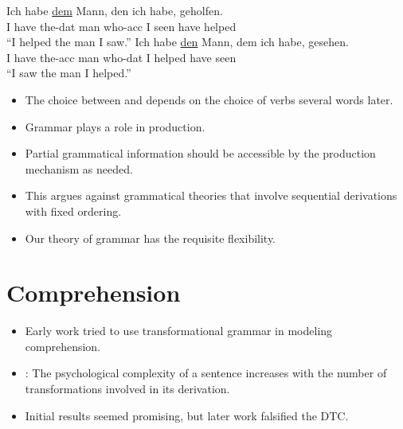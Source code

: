 \documentclass[a4paper,landscape,headrule,footrule]{foils}
\begin{document}
\begin{exe}
\ex\gll Ich habe   \ul{dem}  Mann,  den    ich  habe, geholfen. \\
I   have  the-dat man who-acc I   seen      have   helped\\
\trans    ``I helped the man I saw.''
\ex \gll Ich habe   \ul{den}   Mann,  dem    ich  habe, gesehen.\\
    I   have the-acc man  who-dat I    helped    have   seen\\
\trans    ``I saw the man I helped.''
\end{exe}
\begin{itemize}
\item The choice between  and  depends on the choice of 
  verbs several words later.
\end{itemize}



\begin{itemize}
\item Grammar plays a role in production.
\item Partial grammatical information should be accessible by 
the production mechanism as needed.
\item This argues against grammatical theories that involve 
sequential derivations with fixed ordering.
\item Our theory of grammar has the requisite flexibility.
\end{itemize}

\section{Comprehension}



\begin{itemize}
\item Early work tried to use transformational grammar in 
modeling comprehension.
\item {}:  The 
psychological complexity of a sentence increases 
with the number of transformations involved in its 
derivation.
\item Initial results seemed promising, but later work 
falsified the DTC.
\end{itemize}

\end{document}
